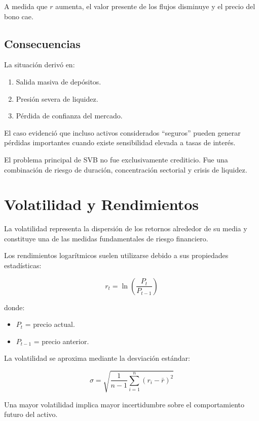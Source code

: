 A medida que $r$ aumenta, el valor presente de los flujos disminuye y el precio del bono cae.

\subsection{Consecuencias}

La situación derivó en:

\begin{enumerate}
    \item Salida masiva de depósitos.
    \item Presión severa de liquidez.
    \item Pérdida de confianza del mercado.
\end{enumerate}

El caso evidenció que incluso activos considerados ``seguros'' pueden generar pérdidas importantes cuando existe sensibilidad elevada a tasas de interés.

\begin{tcolorbox}[colback=red!5,colframe=red!60!black,title=Insight de Riesgo]
El problema principal de SVB no fue exclusivamente crediticio. Fue una combinación de riesgo de duración, concentración sectorial y crisis de liquidez.
\end{tcolorbox}

\section{Volatilidad y Rendimientos}

La volatilidad representa la dispersión de los retornos alrededor de su media y constituye una de las medidas fundamentales de riesgo financiero.

Los rendimientos logarítmicos suelen utilizarse debido a sus propiedades estadísticas:

\[
r_t = \ln\left(\frac{P_t}{P_{t-1}}\right)
\]

donde:

\begin{itemize}
    \item $P_t$ = precio actual.
    \item $P_{t-1}$ = precio anterior.
\end{itemize}

La volatilidad se aproxima mediante la desviación estándar:

\[
\sigma = \sqrt{\frac{1}{n-1}\sum_{i=1}^{n}(r_i-\bar r)^2}
\]

Una mayor volatilidad implica mayor incertidumbre sobre el comportamiento futuro del activo.

